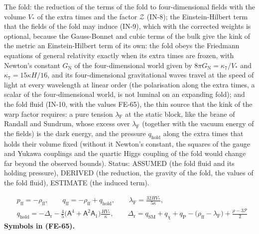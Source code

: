 \documentclass[
  10pt,
]{article}
\begin{document}
The fold: the reduction of the terms of the fold to four-dimensional
fields with the volume \(V_*\) of the extra times and the factor
\(\mathcal{Z}\) (IN-8); the Einstein-Hilbert term that the fields of the
fold may induce (IN-9), which with the corrected weights is optional,
because the Gauss-Bonnet and cubic terms of the bulk give the kink of
the metric an Einstein-Hilbert term of its own: the fold obeys the
Friedmann equations of general relativity exactly when its extra times
are frozen, with Newton's constant \(G_{\mathrm{N}}\) of the
four-dimensional world given by \(8\pi G_{\mathrm{N}} = \kappa_7/V_*\)
and \(\kappa_7 = 15\kappa H/16\), and its four-dimensional gravitational
waves travel at the speed of light at every wavelength at linear order
(the polarisation along the extra times, a scalar of the
four-dimensional world, is not luminal on an expanding fold); and the
fold fluid (IN-10, with the values FE-65), the thin source that the kink
of the warp factor requires: a pure tension \(\lambda_{\mathrm{F}}\) at
the static block, like the brane of Randall and Sundrum, whose excess
over \(\lambda_{\mathrm{F}}\) (together with the vacuum energy of the
fields) is the dark energy, and the pressure \(q_{\mathrm{hold}}\) along
the extra times that holds their volume fixed (without it Newton's
constant, the squares of the gauge and Yukawa couplings and the quartic
Higgs coupling of the fold would change far beyond the observed bounds).
Status: ASSUMED (the fold fluid and its holding pressure), DERIVED (the
reduction, the gravity of the fold, the values of the fold fluid),
ESTIMATE (the induced term).

\[
\begin{aligned}
&p_{\mathrm{ff}} = -\rho_{\mathrm{ff}},\qquad q_{\mathrm{ff}} = -\rho_{\mathrm{ff}} + q_{\mathrm{hold}},\qquad
 \lambda_{\mathrm{F}} = \frac{32HV_*}{5\kappa},\\
&q_{\mathrm{hold}} = -\Delta_{\mathrm{r}} - \frac45\big(\mathsf{A}^4 + \mathsf{A}^2\mathsf{A}_1\big)\frac{HV_*}{\kappa},\qquad
 \Delta_{\mathrm{r}} = q_{\mathrm{SM}} + q_\chi + q_{\mathrm{P}} - \big(\rho_{\mathrm{ff}} - \lambda_{\mathrm{F}}\big) + \frac{\rho - 3\mathcal{P}}{2}
\end{aligned} \tag{FE-65}
\] \textbf{Symbols in (FE-65).}
\end{document}
